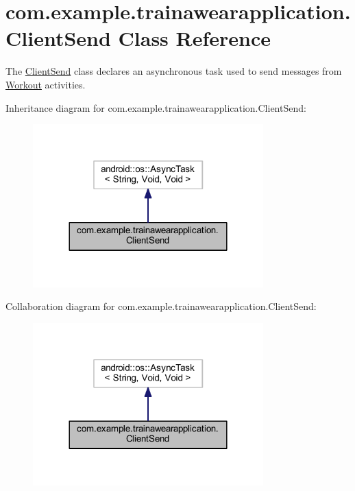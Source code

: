 \hypertarget{classcom_1_1example_1_1trainawearapplication_1_1_client_send}{}\section{com.\+example.\+trainawearapplication.\+Client\+Send Class Reference}
\label{classcom_1_1example_1_1trainawearapplication_1_1_client_send}


The \mbox{\hyperlink{classcom_1_1example_1_1trainawearapplication_1_1_client_send}{Client\+Send}} class declares an asynchronous task used to send messages from \mbox{\hyperlink{classcom_1_1example_1_1trainawearapplication_1_1_workout}{Workout}} activities.  




Inheritance diagram for com.\+example.\+trainawearapplication.\+Client\+Send\+:
\nopagebreak
\begin{figure}[H]
\begin{center}
\leavevmode
\includegraphics[width=252pt]{classcom_1_1example_1_1trainawearapplication_1_1_client_send__inherit__graph}
\end{center}
\end{figure}


Collaboration diagram for com.\+example.\+trainawearapplication.\+Client\+Send\+:
\nopagebreak
\begin{figure}[H]
\begin{center}
\leavevmode
\includegraphics[width=252pt]{classcom_1_1example_1_1trainawearapplication_1_1_client_send__coll__graph}
\end{center}
\end{figure}
